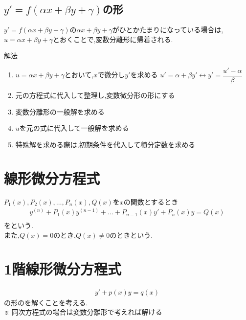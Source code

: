 \documentclass[a4paper]{jsarticle}
\begin{document}
\subsection{$y'=f\left(\alpha x+\beta y+\gamma\right)$の形}
$y'=f\left(\alpha x+\beta y+\gamma\right)$の$\alpha x+\beta y+\gamma$がひとかたまりになっている場合は,
$u=\alpha x+\beta y+\gamma$とおくことで,変数分離形に帰着される.
\begin{itembox}[l]{解法}
    \begin{enumerate}[(1)]
        \item $u=\alpha x+\beta y+\gamma$とおいて,$x$で微分し$y'$を求める
              \quad$u'=\alpha+\beta y'\leftrightarrow y'=\dfrac{u'-\alpha}{\beta}$
        \item 元の方程式に代入して整理し,変数微分形の形にする
        \item 変数分離形の一般解を求める
        \item $u$を元の式に代入して一般解を求める
        \item 特殊解を求める際は,初期条件を代入して積分定数を求める
    \end{enumerate}
\end{itembox}
\section{線形微分方程式}
$P_1\left(x\right),P_2\left(x\right),\dots,P_n\left(x\right),Q\left(x\right)$を$x$の関数とするとき\\
\begin{eqnarray*}
    y^{\left(n\right)}+P_1\left(x\right)y^{\left(n-1\right)}+\dots+P_{n-1}\left(x\right)y'+P_n\left(x\right)y=Q\left(x\right)\\
\end{eqnarray*}
をという.\\
また,$Q\left(x\right)=0$のとき,$Q\left(x\right)\neq0$のときという.
\section{1階線形微分方程式}
\begin{eqnarray*}
    y'+p\left(x\right)y=q\left(x\right)
\end{eqnarray*}
の形のを解くことを考える.\\
※ 同次方程式の場合は変数分離形で考えれば解ける
\end{document}
